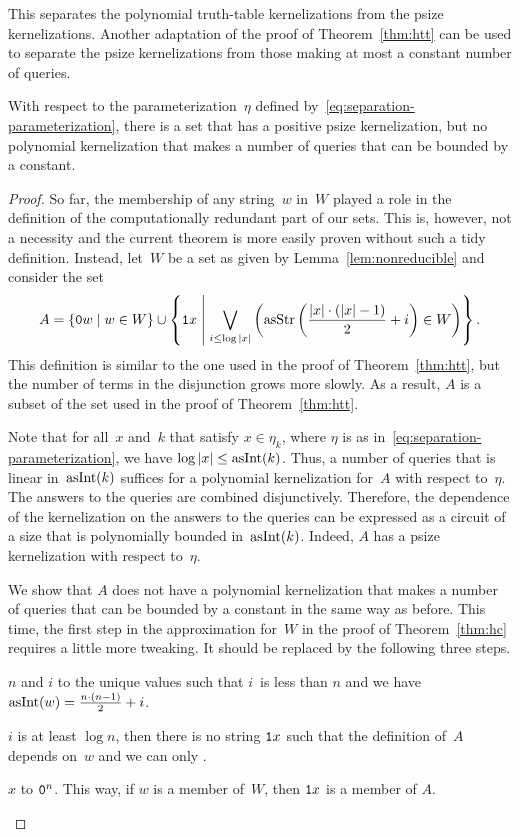 This separates the polynomial truth-table kernelizations from the psize kernelizations.
Another adaptation of the proof of Theorem~\ref{thm:htt} can be used to separate the psize kernelizations from those making at most a constant number of queries.

\begin{theorem}
\label{thm:hpsize}%
  With respect to the parameterization~$\eta$ defined by~\eqref{eq:separation-parameterization}, there is a set that has a positive psize kernelization, but no polynomial kernelization that makes a number of queries that can be bounded by a constant.
\end{theorem}
\begin{proof}
  So far, the membership of any string~$w$ in~$W$ played a role in the definition of the computationally redundant part of our sets.
  This is, however, not a necessity and the current theorem is more easily proven without such a tidy definition.
  Instead, let~$W$ be a set as given by Lemma~\ref{lem:nonreducible} and consider the set
  \begin{equation*}
    A \deq \{\bits{0}w \st w \in W\} \cup \left\{\bits{1}x \st[\middle] \bigvee_{i \le \log\length{x}} \left(\asStr\left(\frac{\length{x} \cdot (\length{x} - 1)}{2} + i\right) \in W\right)\right\}.
  \end{equation*}
  This definition is similar to the one used in the proof of Theorem~\ref{thm:htt}, but the number of terms in the disjunction grows more slowly.
  As a result, $A$ is a subset of the set used in the proof of Theorem~\ref{thm:htt}.

  Note that for all~$x$ and~$k$ that satisfy $x \in \eta_k$, where $\eta$ is as in~\eqref{eq:separation-parameterization}, we have $\log \length{x} \le \asNat(k)$.
  Thus, a number of queries that is linear in~$\asNat(k)$ suffices for a polynomial kernelization for~$A$ with respect to~$\eta$.
  The answers to the queries are combined disjunctively.
  Therefore, the dependence of the kernelization on the answers to the queries can be expressed as a circuit of a size that is polynomially bounded in~$\asNat(k)$.
  Indeed, $A$ has a psize kernelization with respect to~$\eta$.

  We show that $A$ does not have a polynomial kernelization that makes a number of queries that can be bounded by a constant in the same way as before.
  This time, the first step in the approximation for~$W$ in the proof of Theorem~\ref{thm:hc} requires a little more tweaking.
  It should be replaced by the following three steps.
  \begin{codelisting}
  \item
     $n$ and $i$ to the unique values such that $i$~is less than $n$ and we have $\asNat(w) = \frac{n \cdot (n - 1)}{2} + i$.
  \item
     $i$ is at least $\log n$, then there is no string $\bits{1}x$ such that the definition of~$A$ depends on~$w$ and we can only  .
  \item
     $x$ to $\bits{0}^n$.
    This way, if $w$ is a member of~$W$, then $\bits{1}x$ is a member of $A$.
  \end{codelisting}


\end{proof}
